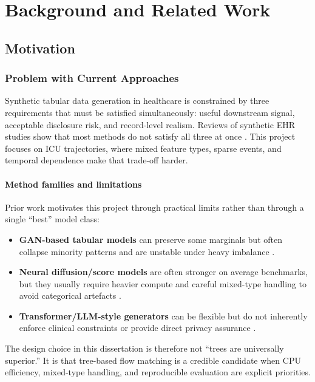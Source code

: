 \chapter{Background and Related Work}
\label{ch:background}

\section{Motivation}
\subsection{Problem with Current Approaches}
\noindent Synthetic tabular data generation in healthcare is constrained by three requirements that must be satisfied simultaneously: useful downstream signal, acceptable disclosure risk, and record-level realism. Reviews of synthetic EHR studies show that most methods do not satisfy all three at once \cite{yan2022benchmarking,kaabachi2025scoping}. This project focuses on ICU trajectories, where mixed feature types, sparse events, and temporal dependence make that trade-off harder.

\subsubsection{Method families and limitations}

Prior work motivates this project through practical limits rather than through a single ``best'' model class:
\begin{itemize}\tightlist
    \item \textbf{GAN-based tabular models} can preserve some marginals but often collapse minority patterns and are unstable under heavy imbalance \cite{yan2022benchmarking,xu2019ctgan}.
    \item \textbf{Neural diffusion/score models} are often stronger on average benchmarks, but they usually require heavier compute and careful mixed-type handling to avoid categorical artefacts \cite{kotelnikov2023tabddpm,shi2025tabdiff}.
    \item \textbf{Transformer/LLM-style generators} can be flexible but do not inherently enforce clinical constraints or provide direct privacy assurance \cite{borisov2023great,wang2022promptehr}.
\end{itemize}
The design choice in this dissertation is therefore not ``trees are universally superior.'' It is that tree-based flow matching is a credible candidate when CPU efficiency, mixed-type handling, and reproducible evaluation are explicit priorities.

